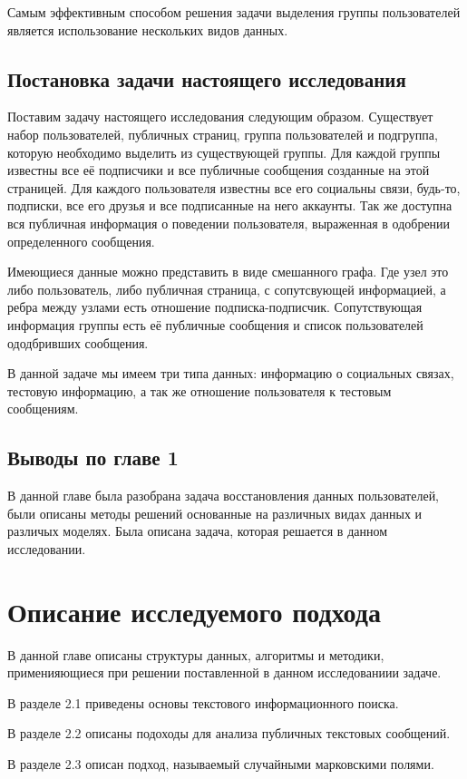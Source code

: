 \documentclass[annotation,times,page4]{itmo-student-thesis}
\begin{document}
Самым эффективным способом решения задачи выделения группы пользователей является использование нескольких видов данных. 
\section{Постановка задачи настоящего исследования}
Поставим задачу настоящего исследования следующим образом. Существует набор пользователей, публичных страниц, группа пользователей и подгруппа, которую необходимо выделить из существующей группы. Для каждой группы известны все её подписчики и все публичные сообщения созданные на этой страницей. Для каждого пользователя известны все его социальны связи, будь-то, подписки, все его друзья и все подписанные на него аккаунты. Так же доступна вся публичная информация о поведении пользователя, выраженная в одобрении определенного сообщения.

Имеющиеся данные можно представить в виде смешанного графа. Где узел это либо пользователь, либо публичная страница, с сопутсвующей информацией, а ребра между узлами есть отношение подписка-подписчик. Сопутствующая информация группы есть её публичные сообщения и список пользователей ододбривших сообщения. 

В данной задаче мы имеем три типа данных: информацию о социальных связах, тестовую информацию, а так же отношение пользователя к тестовым сообщениям. 

\section{Выводы по главе 1}
В данной главе была разобрана задача восстановления данных пользователей, были описаны методы решений основанные на различных видах данных и различых моделях. Была описана задача, которая решается в данном исследовании.

\chapter{Описание исследуемого подхода}
В данной главе описаны структуры данных, алгоритмы и методики, применияющиеся при решении поставленной в данном исследованиии задаче.

В разделе 2.1 приведены основы текстового информационного поиска.

В разделе 2.2 описаны подоходы для анализа публичных текстовых сообщений.

В разделе 2.3 описан подход, называемый случайными марковскими полями.
\end{document}
